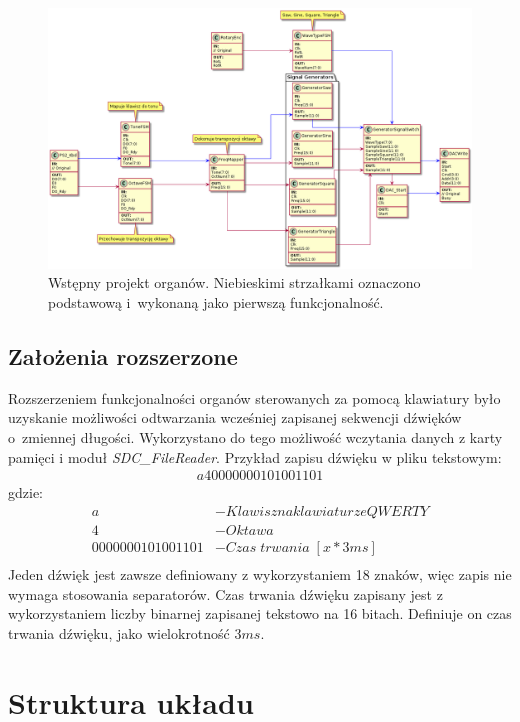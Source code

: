 \documentclass[12pt]{article}
\begin{document}
\begin{figure}[H]
  \centering
  \includegraphics[width=\linewidth]{./diagram/out/flow_chart}
  \caption{Wstępny projekt organów. Niebieskimi strzałkami oznaczono podstawową i~wykonaną jako pierwszą funkcjonalność. }
  \label{base}
\end{figure}

\subsection{Założenia rozszerzone}

Rozszerzeniem funkcjonalności organów sterowanych za pomocą klawiatury było uzyskanie możliwości odtwarzania wcześniej zapisanej sekwencji dźwięków o~zmiennej długości. Wykorzystano do tego możliwość wczytania danych z karty pamięci i moduł \textit{SDC\_FileReader}.
Przykład zapisu dźwięku w pliku tekstowym:
\begin{align*}
  a40000000101001101
\end{align*}
gdzie:
\begin{align*}
  a                & - Klawisz na klawiaturze QWERTY \\
  4                & - Oktawa                 \\
  0000000101001101 & - Czas\;trwania\;[x*3ms] \\
\end{align*}
Jeden dźwięk jest zawsze definiowany z wykorzystaniem 18 znaków, więc zapis nie wymaga stosowania separatorów. Czas trwania dźwięku zapisany jest z wykorzystaniem liczby binarnej zapisanej tekstowo na 16 bitach. Definiuje on czas trwania dźwięku, jako wielokrotność $3ms$.

\section{Struktura układu}
\end{document}

